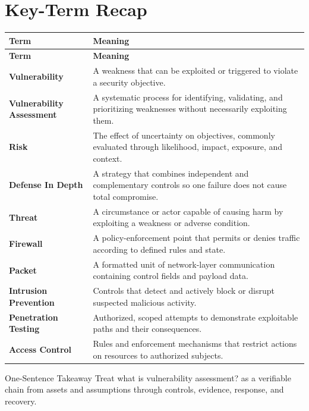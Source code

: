 \documentclass[11pt,letterpaper]{article}
\begin{document}
\section*{Key-Term Recap}
\begin{longtable}{>{\RaggedRight\arraybackslash}p{}>{\RaggedRight\arraybackslash}p{}}
\toprule\rowcolor{Navy}\color{white}\textbf{Term} & \color{white}\textbf{Meaning}\\\midrule
\endfirsthead
\toprule\rowcolor{Navy}\color{white}\textbf{Term} & \color{white}\textbf{Meaning}\\\midrule
\endhead
\textbf{Vulnerability} & A weakness that can be exploited or triggered to violate a security objective. \\\midrule
\textbf{Vulnerability Assessment} & A systematic process for identifying, validating, and prioritizing weaknesses without necessarily exploiting them. \\\midrule
\textbf{Risk} & The effect of uncertainty on objectives, commonly evaluated through likelihood, impact, exposure, and context. \\\midrule
\textbf{Defense In Depth} & A strategy that combines independent and complementary controls so one failure does not cause total compromise. \\\midrule
\textbf{Threat} & A circumstance or actor capable of causing harm by exploiting a weakness or adverse condition. \\\midrule
\textbf{Firewall} & A policy-enforcement point that permits or denies traffic according to defined rules and state. \\\midrule
\textbf{Packet} & A formatted unit of network-layer communication containing control fields and payload data. \\\midrule
\textbf{Intrusion Prevention} & Controls that detect and actively block or disrupt suspected malicious activity. \\\midrule
\textbf{Penetration Testing} & Authorized, scoped attempts to demonstrate exploitable paths and their consequences. \\\midrule
\textbf{Access Control} & Rules and enforcement mechanisms that restrict actions on resources to authorized subjects. \\\midrule
\bottomrule
\end{longtable}
\begin{CornellExamBox}{One-Sentence Takeaway}
Treat what is vulnerability assessment? as a verifiable chain from assets and assumptions through controls, evidence, response, and recovery.
\end{CornellExamBox}
\end{document}
